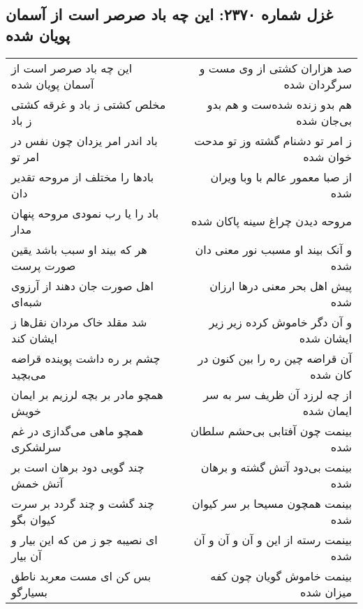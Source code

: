 \begin{center}
\section*{غزل شماره ۲۳۷۰: این چه باد صرصر است از آسمان پویان شده}
\label{sec:2370}
\begin{longtable}{l p{0.5cm} r}
این چه باد صرصر است از آسمان پویان شده
&&
صد هزاران کشتی از وی مست و سرگردان شده
\\
مخلص کشتی ز باد و غرقه کشتی ز باد
&&
هم بدو زنده شده‌ست و هم بدو بی‌جان شده
\\
باد اندر امر یزدان چون نفس در امر تو
&&
ز امر تو دشنام گشته وز تو مدحت خوان شده
\\
بادها را مختلف از مروحه تقدیر دان
&&
از صبا معمور عالم با وبا ویران شده
\\
باد را یا رب نمودی مروحه پنهان مدار
&&
مروحه دیدن چراغ سینه پاکان شده
\\
هر که بیند او سبب باشد یقین صورت پرست
&&
و آنک بیند او مسبب نور معنی دان شده
\\
اهل صورت جان دهند از آرزوی شبه‌ای
&&
پیش اهل بحر معنی درها ارزان شده
\\
شد مقلد خاک مردان نقل‌ها ز ایشان کند
&&
و آن دگر خاموش کرده زیر زیر ایشان شده
\\
چشم بر ره داشت پوینده قراضه می‌بچید
&&
آن قراضه چین ره را بین کنون در کان شده
\\
همچو مادر بر بچه لرزیم بر ایمان خویش
&&
از چه لرزد آن ظریف سر به سر ایمان شده
\\
همچو ماهی می‌گدازی در غم سرلشکری
&&
بینمت چون آفتابی بی‌حشم سلطان شده
\\
چند گویی دود برهان است بر آتش خمش
&&
بینمت بی‌دود آتش گشته و برهان شده
\\
چند گشت و چند گردد بر سرت کیوان بگو
&&
بینمت همچون مسیحا بر سر کیوان شده
\\
ای نصیبه جو ز من که این بیار و آن بیار
&&
بینمت رسته از این و آن و آن و آن شده
\\
بس کن ای مست معربد ناطق بسیارگو
&&
بینمت خاموش گویان چون کفه میزان شده
\\
\end{longtable}
\end{center}
